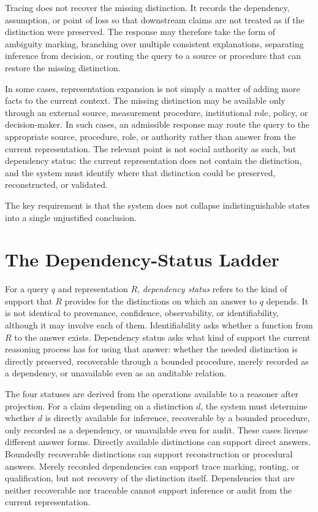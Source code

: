 \documentclass[11pt]{article}
\begin{document}
Tracing does not recover the missing distinction. It records the dependency, assumption, or point of loss so that downstream claims are not treated as if the distinction were preserved. The response may therefore take the form of ambiguity marking, branching over multiple consistent explanations, separating inference from decision, or routing the query to a source or procedure that can restore the missing distinction.

In some cases, representation expansion is not simply a matter of adding more facts to the current context. The missing distinction may be available only through an external source, measurement procedure, institutional role, policy, or decision-maker. In such cases, an admissible response may route the query to the appropriate source, procedure, role, or authority rather than answer from the current representation. The relevant point is not social authority as such, but dependency status: the current representation does not contain the distinction, and the system must identify where that distinction could be preserved, reconstructed, or validated.

The key requirement is that the system does not collapse indistinguishable states into a single unjustified conclusion.

\section{The Dependency-Status Ladder}

For a query $q$ and representation $R$, \emph{dependency status} refers to the kind of support that $R$ provides for the distinctions on which an answer to $q$ depends. It is not identical to provenance, confidence, observability, or identifiability, although it may involve each of them. Identifiability asks whether a function from $R$ to the answer exists. Dependency status asks what kind of support the current reasoning process has for using that answer: whether the needed distinction is directly preserved, recoverable through a bounded procedure, merely recorded as a dependency, or unavailable even as an auditable relation.

The four statuses are derived from the operations available to a reasoner after projection. For a claim depending on a distinction $d$, the system must determine whether $d$ is directly available for inference, recoverable by a bounded procedure, only recorded as a dependency, or unavailable even for audit. These cases license different answer forms. Directly available distinctions can support direct answers. Boundedly recoverable distinctions can support reconstruction or procedural answers. Merely recorded dependencies can support trace marking, routing, or qualification, but not recovery of the distinction itself. Dependencies that are neither recoverable nor traceable cannot support inference or audit from the current representation.
\end{document}
